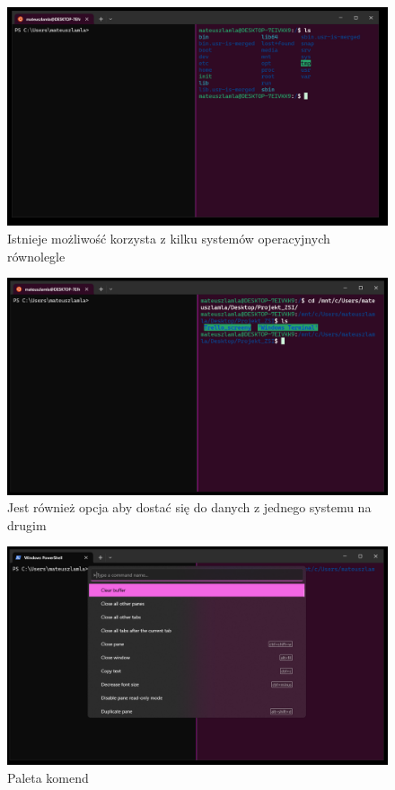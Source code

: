 \documentclass[0.82pt,a4paper]{article}
\begin{document}
    \begin{figure}[H]
        \centering
        \includegraphics[width=0.8\linewidth]{media/Windows Terminal/3_mozliwosc_korzystania_z_dwoch_systemow.PNG}
        \caption[]{Istnieje możliwość korzysta z kilku systemów operacyjnych równolegle}
        \label{fig:terminal_dwa_systemy}
    \end{figure}

    \begin{figure}[H]
        \centering
        \includegraphics[width=0.8\linewidth]{media/Windows Terminal/3_1_dostep do danych na jednym systemie z drugiego.PNG}
        \caption[]{Jest również opcja aby dostać się do danych z jednego systemu na drugim}
        \label{fig:terminal_dostep_miedzy_systemami}
    \end{figure}

    \begin{figure}[H]
        \centering
        \includegraphics[width=0.8\linewidth]{media/Windows Terminal/4_command_palette.PNG}
        \caption[]{Paleta komend}
        \label{fig:terminal_paleta_komend}
    \end{figure}
\end{document}
